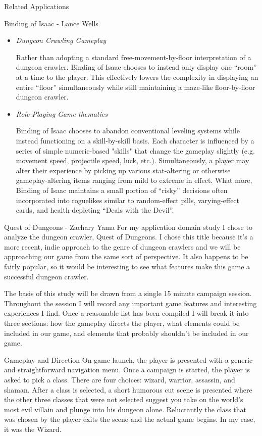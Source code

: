 \documentclass[12pt]{report}
\begin{document}
\begin{section}{Related Applications}
\begin{subsection}{Binding of Isaac - Lance Wells}
\begin{itemize}
\item	\emph{Dungeon Crawling Gameplay}

Rather than adopting a standard free-movement-by-floor interpretation of a
dungeon crawler. Binding of Isaac chooses to instead only display one
``room'' at a time to the player. This effectively lowers the complexity in
displaying an entire ``floor'' simultaneously while still maintaining a
maze-like floor-by-floor dungeon crawler.

\item	\emph{Role-Playing Game thematics}

Binding of Isaac chooses to abandon conventional leveling systems while
instead functioning on a skill-by-skill basis. Each character is influenced
by a series of simple numeric-based "skills" that change the gameplay
slightly (e.g. movement speed, projectile speed, luck, etc.).
Simultaneously, a player may alter their experience by picking up various
stat-altering or otherwise gameplay-altering items ranging from mild to
extreme in effect. What more, Binding of Isaac maintains a small portion of
``risky'' decisions often incorporated into roguelikes similar to
random-effect pills, varying-effect  cards, and health-depleting ``Deals
with the Devil''.
\end{itemize}
\end{subsection}

\begin{subsection}{Quest of Dungeons - Zachary Yama}
For my application domain study I chose to analyze the dungeon crawler,
Quest of Dungeons. I chose this title because it’s a more recent, indie
approach to the genre of dungeon crawlers and we will be approaching our
game from the same sort of perspective. It also happens to be fairly
popular, so it would be interesting to see what features make this game a
successful dungeon crawler.
 
The basis of this study will be drawn from a single 15 minute campaign
session. Throughout the session I will record any important game features
and interesting experiences I find. Once a reasonable list has been
compiled I will break it into three sections: how the gameplay directs 
the player, what elements could be included in our game, and elements that
probably shouldn’t be included in our game.
 
\begin{subsubsection}{Gameplay and Direction}
On game launch, the player is presented with a generic and straightforward
navigation menu. Once a campaign is started, the player is asked to pick a
class. There are four choices: wizard, warrior, assassin, and shaman. After
a class is selected, a short humorous cut scene is presented where the
other three classes that were not selected suggest you take on the world’s
most evil villain and plunge into his dungeon alone. Reluctantly the class
that was chosen by the player exits the scene and the actual game begins.
In my case, it was the Wizard.
 

\end{subsubsection}
\end{subsection}
\end{section}
\end{document}
